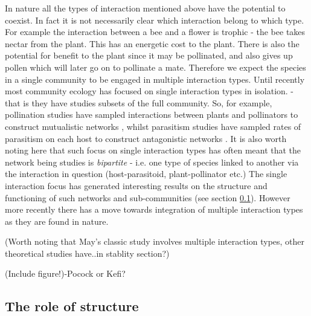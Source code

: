 In nature all the types of interaction mentioned above have the potential to coexist. In fact it is not necessarily clear which interaction belong to which type. For example the interaction between a bee and a flower is trophic - the bee takes nectar from the plant. This has an energetic cost to the plant. There is also the potential for benefit to the plant since it may be pollinated, and also gives up pollen which will later go on to pollinate a mate. Therefore we expect the species in a single community to be engaged in multiple interaction types. Until recently most community ecology has focused on single interaction types in isolation. - that is they have studies subsets of the full community. So, for example, pollination studies have sampled interactions between plants and pollinators to construct mutualistic networks \cite{gibson2011sampling}, whilst parasitism studies have sampled rates of parasitism on each host to construct antagonistic networks \cite{tylianakis2007habitat}. It is also worth noting here that such focus on single interaction types has often meant that the network being studies is \emph{bipartite} - i.e. one type of species linked to another via the interaction in question (host-parasitoid, plant-pollinator etc.) The single interaction focus has generated interesting results on the structure and functioning of such networks and sub-communities (see section \ref{sec:intro_role_of_sturcture}). However more recently there has a move towards integration of multiple interaction types as they are found in nature.        

(Worth noting that May's classic study involves multiple interaction types, other theoretical studies have..in stablity section?)

(Include figure!)-Pocock or Kefi?

\subsection{The role of structure}
\label{sec:intro_role_of_sturcture}

